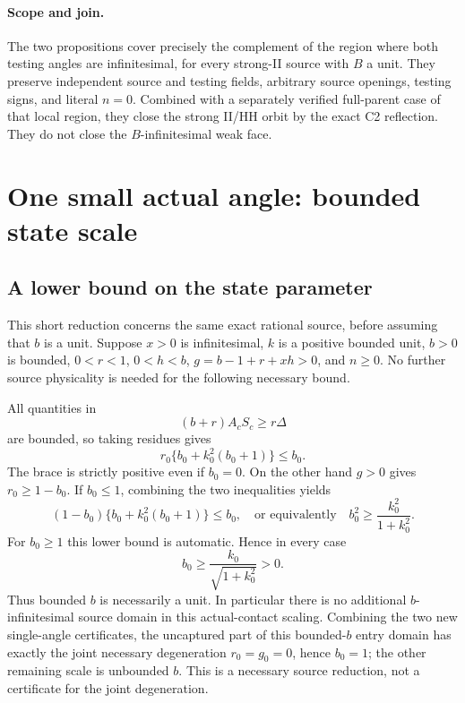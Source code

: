 \paragraph{Scope and join.}
The two propositions cover precisely the complement of the region
where both testing angles are infinitesimal, for every strong-II
source with $B$ a unit.  They preserve independent source and testing
fields, arbitrary source openings, testing signs, and literal $n=0$.
Combined with a separately verified full-parent case of that
local region, they close the strong II/HH orbit by the exact C2
reflection.  They do not close the $B$-infinitesimal weak face.

\section{One small actual angle: bounded state scale}
\subsection{A lower bound on the state parameter}
\label{component:p7294aae40ee2}

\label{p7294aae40ee2:sec:c2-bounded-state-entry}

This short reduction concerns the same exact rational source, before
assuming that $b$ is a unit.  Suppose $x>0$ is infinitesimal, $k$ is
a positive bounded unit, $b>0$ is bounded, $0<r<1$, $0<h<b$,
$g=b-1+r+xh>0$, and $n\geq0$.  No further source physicality is
needed for the following necessary bound.

All quantities in
\[
             (b+r)A_cS_c\geq r\Delta
\]
are bounded, so taking residues gives
\[
 r_0\{b_0+k_0^2(b_0+1)\}\leq b_0.
\]
The brace is strictly positive even if $b_0=0$.  On the other hand
$g>0$ gives $r_0\geq1-b_0$.  If $b_0\leq1$, combining the two
inequalities yields
\[
 (1-b_0)\{b_0+k_0^2(b_0+1)\}\leq b_0,
 \quad\text{or equivalently}\quad
              b_0^2\geq\frac{k_0^2}{1+k_0^2}.
\]
For $b_0\geq1$ this lower bound is automatic.  Hence in every case
\[
                b_0\geq\frac{k_0}{\sqrt{1+k_0^2}}>0.
\]
Thus bounded $b$ is necessarily a unit.  In particular there is no
additional $b$-infinitesimal source domain in this actual-contact
scaling.  Combining the two new single-angle certificates, the
uncaptured part of this bounded-$b$ entry domain has exactly the
joint necessary degeneration $r_0=g_0=0$, hence $b_0=1$; the other
remaining scale is unbounded $b$.  This is a necessary source
reduction, not a certificate for the joint degeneration.

